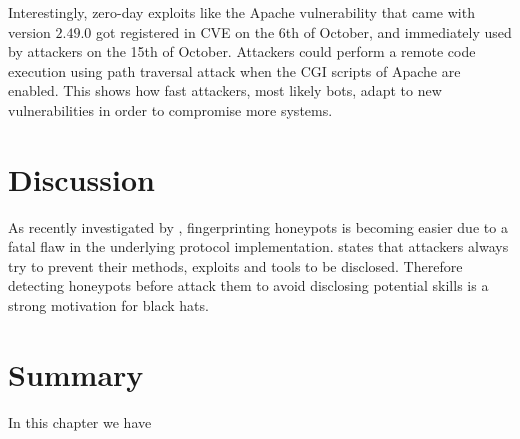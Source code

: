 Interestingly, zero-day exploits like the Apache vulnerability \cite{CVE-2021-42013} that came with version $2.49.0$ got registered in CVE on the 6th of October, and immediately used by attackers on the 15th of October.
Attackers could perform a remote code execution using path traversal attack when the CGI scripts of Apache are enabled.
This shows how fast attackers, most likely bots, adapt to new vulnerabilities in order to compromise more systems.


\section{Discussion}

As recently investigated by \citet{vetterl2020}, fingerprinting honeypots is becoming easier due to a fatal flaw in the underlying protocol implementation.
\citet{vetterl2020} states that attackers always try to prevent their methods, exploits and tools to be disclosed.
Therefore detecting honeypots before attack them to avoid disclosing potential skills is a strong motivation for black hats.


\section{Summary}

In this chapter we have




